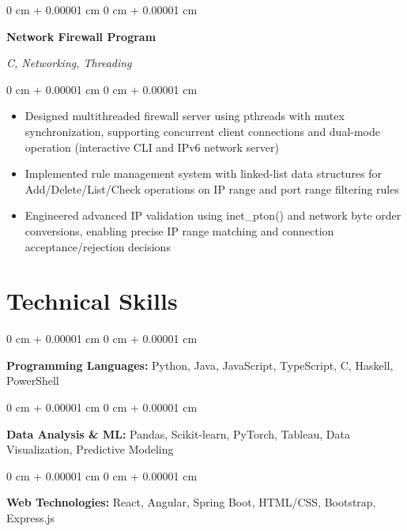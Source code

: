 \documentclass[10pt, a4paper]{article}
\newenvironment{highlights}{
    \begin{itemize}[
        topsep=0.10 cm,
        parsep=0.10 cm,
        partopsep=0pt,
        itemsep=0pt,
        leftmargin=20pt
    ]
}{
    \end{itemize}
} %
\newenvironment{onecolentry}{
    \begin{adjustwidth}{
        0 cm + 0.00001 cm
    }{
        0 cm + 0.00001 cm
    }
}{
    \end{adjustwidth}
} %
\newenvironment{twocolentry}[2][]{
    \onecolentry
    \def\secondColumn{#2}
    \setcolumnwidth{\fill, 4.5 cm}
    \begin{paracol}{2}
}{
    \switchcolumn \raggedleft \secondColumn
    \end{paracol}
    \endonecolentry
} %
\begin{document}
    \vspace{0.2 cm}

    \begin{twocolentry}{
        \textit{C, Networking, Threading}
    }
        \textbf{Network Firewall Program}
    \end{twocolentry}

    \vspace{0.10 cm}
    \begin{onecolentry}
        \begin{highlights}
            \item Designed multithreaded firewall server using pthreads with mutex synchronization, supporting concurrent client connections and dual-mode operation (interactive CLI and IPv6 network server)
            \item Implemented rule management system with linked-list data structures for Add/Delete/List/Check operations on IP range and port range filtering rules
            \item Engineered advanced IP validation using inet\_pton() and network byte order conversions, enabling precise IP range matching and connection acceptance/rejection decisions
        \end{highlights}
    \end{onecolentry}

    \section{Technical Skills}

    \begin{onecolentry}
        \textbf{Programming Languages:} Python, Java, JavaScript, TypeScript, C, Haskell, PowerShell
    \end{onecolentry}

    \vspace{0.2 cm}

    \begin{onecolentry}
        \textbf{Data Analysis \& ML:} Pandas, Scikit-learn, PyTorch, Tableau, Data Visualization, Predictive Modeling
    \end{onecolentry}

    \vspace{0.2 cm}

    \begin{onecolentry}
        \textbf{Web Technologies:} React, Angular, Spring Boot, HTML/CSS, Bootstrap, Express.js
    \end{onecolentry}
\end{document}
